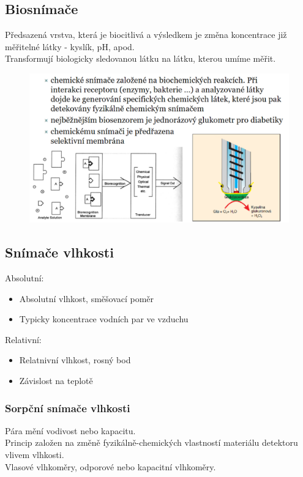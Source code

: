 \subsection{Biosnímače}
Předsazená vrstva, která je biocitlivá a výsledkem je změna koncentrace již měřitelné látky - kyslík, pH, apod.\\
Transformují biologicky sledovanou látku na látku, kterou umíme měřit.\\
\begin{figure}[h!]
    \centering
    \includegraphics[scale = 0.1]{img/Biosnimace.png}
\end{figure}

\subsection{Snímače vlhkosti}
Absolutní:
\begin{itemize}
    \item Absolutní vlhkost, směšovací poměr
    \item Typicky koncentrace vodních par ve vzduchu
\end{itemize}
Relativní:
\begin{itemize}
    \item Relatnivní vlhkost, rosný bod
    \item Závislost na teplotě
\end{itemize}
\subsubsection{Sorpční snímače vlhkosti}
Pára mění vodivost nebo kapacitu.\\
Princip založen na změně fyzikálně-chemických vlastností materiálu detektoru vlivem vlhkosti.\\
Vlasové vlhkoměry, odporové nebo kapacitní vlhkoměry.\\

